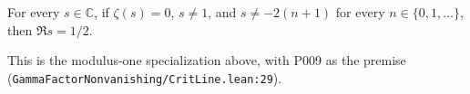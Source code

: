 
\begin{formalstatement}\label{pn:P008}
For every $s\in\mathbb C$, if $\zeta(s)=0$, $s\ne1$, and $s\ne-2(n+1)$ for every $n\in\{0,1,\ldots\}$, then $\Re s=1/2$.
\end{formalstatement}
This is the modulus-one specialization above, with P009 as the premise (\nolinkurl{GammaFactorNonvanishing/CritLine.lean:29}).

